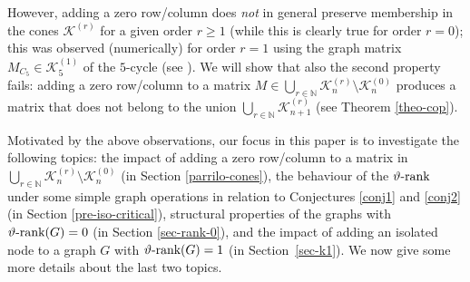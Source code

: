 \documentclass[11pt]{article}
\newcommand{\oN}{{\mathbb N}}
\numberwithin{equation}{section}
\newcommand{\MK}{{\mathcal K}}
\newcommand{\rrank}{\vartheta\text{\rm -rank}}
\begin{document}
However, adding
 a zero row/column does {\em not} in general preserve membership in the cones $ \mathcal K^{(r)}$ for a given order $r\ge 1$ (while this is clearly true for order $r=0$); this was observed (numerically) for order $r=1$ using the graph matrix $M_{C_5}\in \mathcal K^{(1)}_5$ of the $5$-cycle (see \cite{dKP2002}).
We will show that also the second property fails:  adding a zero row/column to a matrix $M\in \bigcup_{r\in \oN}\mathcal K^{(r)}_n\setminus  \MK_n^{(0)}$ produces a matrix that does not belong to the union $\bigcup_{r\in \oN} \mathcal K^{(r)}_{n+1}$ (see Theorem \ref{theo-cop}).


Motivated by the above observations, our focus in this paper is to  investigate the following topics: the impact of adding a zero row/column to a matrix in $\bigcup_{r\in\oN}\mathcal K^{(r)}_n\setminus \mathcal K^{(0)}_n$ (in Section \ref{parrilo-cones}), the behaviour of the $\rrank$ under  some simple graph operations in relation to Conjectures \ref{conj1} and \ref{conj2} (in Section \ref{pre-iso-critical}),  structural properties of the graphs with  $\rrank(G)=0$ (in Section \ref{sec-rank-0}), and   the impact of adding an isolated node to a graph $G$ with $\rrank (G)=1$ (in Section~\ref{sec-k1}). We now give some more details about the last two topics. %
\end{document}
